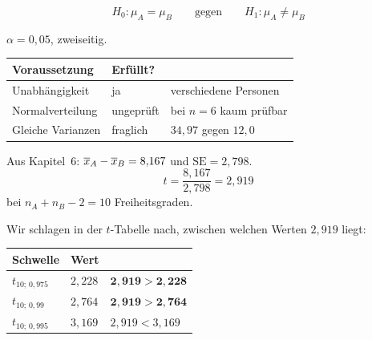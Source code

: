 \begin{merksatz}
\[ H_0: \mu_A = \mu_B \qquad \text{gegen} \qquad H_1: \mu_A \neq \mu_B \]

$\alpha = 0{,}05$, zweiseitig.

\begin{center}
\renewcommand{\arraystretch}{1.45}
\begin{tabular}{@{}P{3.0cm}P{1.8cm}P{3.4cm}@{}}
\toprule
\textbf{Voraussetzung} & \textbf{Erfüllt?} & \\
\midrule
Unabhängigkeit & \textcolor{gruen}{ja} & verschiedene Personen\\
Normal\-verteilung & \textcolor{mittel}{ungeprüft} & bei $n=6$ kaum prüfbar\\
Gleiche Varianzen & \textcolor{mittel}{fraglich} & $34{,}97$ gegen $12{,}0$\\
\bottomrule
\end{tabular}
\end{center}

\begin{center}
\begin{minipage}{0.86\textwidth}
\end{minipage}
\end{center}

Aus Kapitel~6: $\overline{x}_A - \overline{x}_B = 8{,}167$ und $\mathrm{SE} = 2{,}798$.
\[ t = \frac{8{,}167}{2{,}798} = 2{,}919 \]
bei $n_A + n_B - 2 = 10$ Freiheitsgraden.

Wir schlagen in der $t$-Tabelle nach, zwischen welchen Werten $2{,}919$ liegt:
\begin{center}
\renewcommand{\arraystretch}{1.45}
\begin{tabular}{@{}P{2.8cm}P{2.0cm}P{2.6cm}@{}}
\toprule
\textbf{Schwelle} & \textbf{Wert} & \\
\midrule
$t_{10;\,0{,}975}$ & $2{,}228$ & $\mathbf{2{,}919 > 2{,}228}$\\
$t_{10;\,0{,}99}$ & $2{,}764$ & $\mathbf{2{,}919 > 2{,}764}$\\
$t_{10;\,0{,}995}$ & $3{,}169$ & $2{,}919 < 3{,}169$\\
\bottomrule
\end{tabular}
\end{center}


\end{merksatz}
